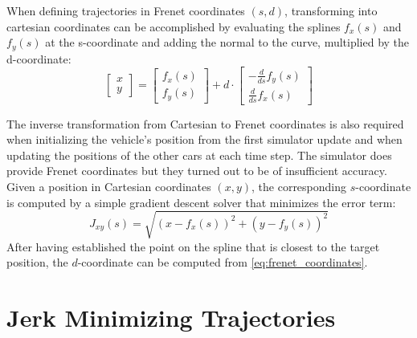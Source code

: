 \documentclass[twoside]{article}
\begin{document}
When defining trajectories in Frenet coordinates $(s,d)$, transforming into cartesian coordinates
can be accomplished by evaluating the splines $f_x(s)$ and $f_y(s)$ at the s-coordinate and adding
the normal to the curve, multiplied by the d-coordinate:
\begin{equation}
  \begin{bmatrix}
    x \\ y
  \end{bmatrix}
  =
  \begin{bmatrix}
    f_x(s) \\
    f_y(s)
  \end{bmatrix}
  +
  d\cdot
  \begin{bmatrix}
    -\frac{d}{ds} f_y(s) \\
     \frac{d}{ds} f_x(s)
  \end{bmatrix}
  \label{eq:frenet_coordinates}
\end{equation}

The inverse transformation from Cartesian to Frenet coordinates is also required when
initializing the vehicle's position from the first simulator update and when updating the
positions of the other cars at each time step. The simulator does provide Frenet coordinates
but they turned out to be of insufficient accuracy. Given a position in Cartesian coordinates $(x,y)$, the corresponding $s$-coordinate is computed by a simple gradient descent solver \cite{Gradient43:online}
that minimizes the error term:
\begin{equation}
  J_{xy}(s) = \sqrt{(x - f_x(s))^2 + (y - f_y(s))^2}
\end{equation}
After having established the point on the spline that is closest to the target position,
the $d$-coordinate can be computed from \eqref{eq:frenet_coordinates}.

\section{Jerk Minimizing Trajectories}
\end{document}
